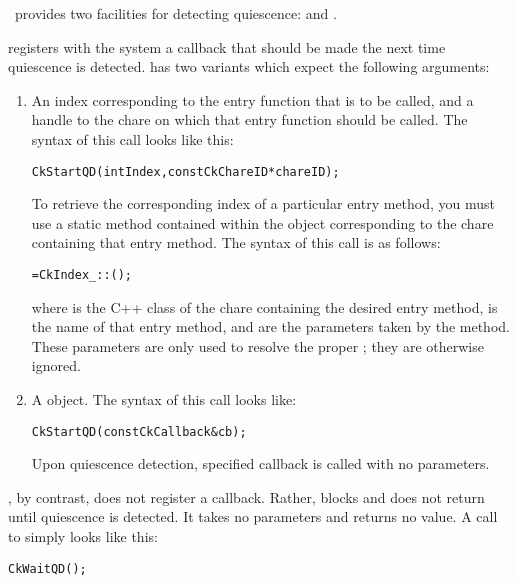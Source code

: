 \charmpp\ provides two facilities for detecting quiescence:  and
.

 registers with the system a callback that should be made the
next time quiescence is detected.   has two
variants which expect the following arguments: 
\begin{enumerate}
\item An index corresponding to the entry function that is to be called,
and a handle to the chare on which that entry function should be called.  The
syntax of this call looks like this:

\begin{alltt}
 CkStartQD(int Index,const CkChareID* chareID);
\end{alltt}

To retrieve the corresponding index of a particular entry
method, you must use a static method contained within the  object
corresponding to the chare containing that entry method.  The
syntax of this call is as follows:

\begin{alltt}
=CkIndex_::();
\end{alltt}

where  is the C++ class of the chare containing
the desired entry method,  is the name of that entry method,
and  are the parameters taken by the method.
These parameters are only used to resolve the proper ;
they are otherwise ignored.

\item 
A  object. The syntax of this call looks like:
\begin{alltt}
  CkStartQD(const CkCallback& cb);
\end{alltt}

Upon quiescence detection, specified callback is called with no parameters.

\end{enumerate}


, by contrast, does not register a callback.  Rather,
 blocks and does not return until quiescence is
detected.  It takes no parameters and returns no value.  A call to
 simply looks like this: 

\begin{alltt}
  CkWaitQD();
\end{alltt}

